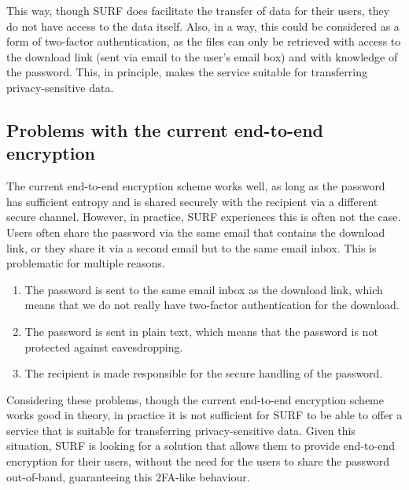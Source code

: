 This way, though SURF does facilitate the transfer of data for their users, they do not have access to the data itself.
Also, in a way, this could be considered as a form of two-factor authentication, as the files can only be retrieved with access to the download link (sent via email to the user's email box) and with knowledge of the password.
This, in principle, makes the service suitable for transferring privacy-sensitive data.

\subsection{Problems with the current end-to-end encryption}\label{subsec:problems-with-the-current-end-to-end-encryption}
The current end-to-end encryption scheme works well, as long as the password has sufficient entropy and is shared securely with the recipient via a different secure channel.
However, in practice, SURF experiences this is often not the case.
Users often share the password via the same email that contains the download link, or they share it via a second email but to the same email inbox.
This is problematic for multiple reasons.

\begin{enumerate}
    \item The password is sent to the same email inbox as the download link, which means that we do not really have two-factor authentication for the download.
    \item The password is sent in plain text, which means that the password is not protected against eavesdropping.
    \item The recipient is made responsible for the secure handling of the password.
\end{enumerate}

Considering these problems, though the current end-to-end encryption scheme works good in theory, in practice it is not sufficient for SURF to be able to offer a service that is suitable for transferring privacy-sensitive data.
Given this situation, SURF is looking for a solution that allows them to provide end-to-end encryption for their users, without the need for the users to share the password out-of-band, guaranteeing this 2FA-like behaviour.

